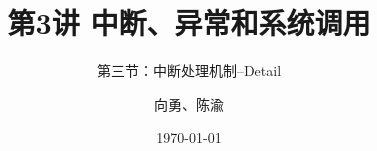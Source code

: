 


\title[第3讲]{第3讲 中断、异常和系统调用} %
\subtitle{第三节：中断处理机制--Detail}
\author{向勇、陈渝} %
\date{\today} %



\begin{frame}
\titlepage %
\end{frame}




